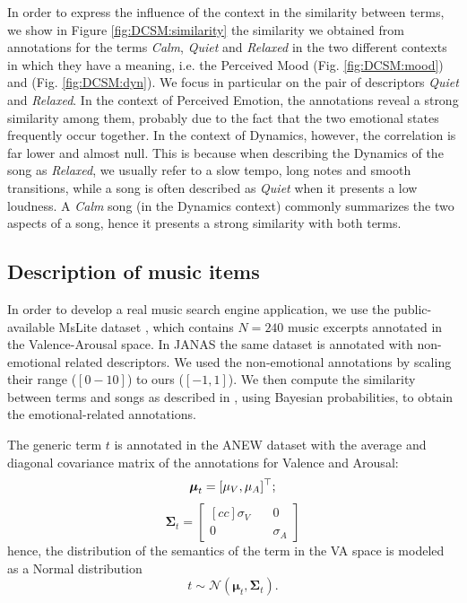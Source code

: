 In order to express the influence of the context in the similarity between terms, we show in Figure \ref{fig:DCSM:similarity} the similarity we obtained from annotations for the terms \textit{Calm}, \textit{Quiet} and \textit{Relaxed} in the two different contexts in which they have a meaning, i.e. the Perceived Mood (Fig. \ref{fig:DCSM:mood}) and (Fig. \ref{fig:DCSM:dyn}). We focus in particular on the pair of descriptors \textit{Quiet} and \textit{Relaxed}. In the context of Perceived Emotion, the annotations reveal a strong similarity among them, probably due to the fact that the two emotional states frequently occur together. In the context of Dynamics, however, the correlation is far lower and almost null. This is because when describing the Dynamics of the song as \textit{Relaxed}, we usually refer to a slow tempo, long notes and smooth transitions, while a song is often described as \textit{Quiet}  when it presents a low loudness. A \textit{Calm} song (in the Dynamics context) commonly summarizes the two aspects of a song, hence it presents a strong similarity with both terms.

\subsection{Description of music items}
\label{dataset}

In order to develop a real music search engine application, we use the public-available MsLite dataset \cite{Youngmoo2008}, which contains $N=240$ music excerpts annotated in the Valence-Arousal space. In JANAS the same dataset is annotated with non-emotional related descriptors. We used the non-emotional annotations by scaling their range ($[0- 10]$) to ours ($[-1, 1]$). We then compute the similarity between terms and songs as described in \cite{Buccoli2013}, using Bayesian probabilities, to obtain the emotional-related annotations.

The generic term $t$ is annotated in the ANEW dataset with the average and diagonal covariance matrix of the annotations for Valence and Arousal:
\begin{equation} 
\boldsymbol{\mu}_t=[\mu_V, \mu_A]^\top ;
\end{equation}
\begin{equation} 
\boldsymbol{\Sigma}_t= 
\left[
\begin{aligned}[c c]
\sigma_V\quad & 0 \\
0 \quad & \sigma_A 
\end{aligned}
\right]
\end{equation}
hence, the distribution of the semantics of the term in the VA space is modeled as a Normal distribution
\begin{equation}
t  \sim \mathcal{N}(\boldsymbol{\mu}_t,\boldsymbol{\Sigma}_t).
\end{equation} 

